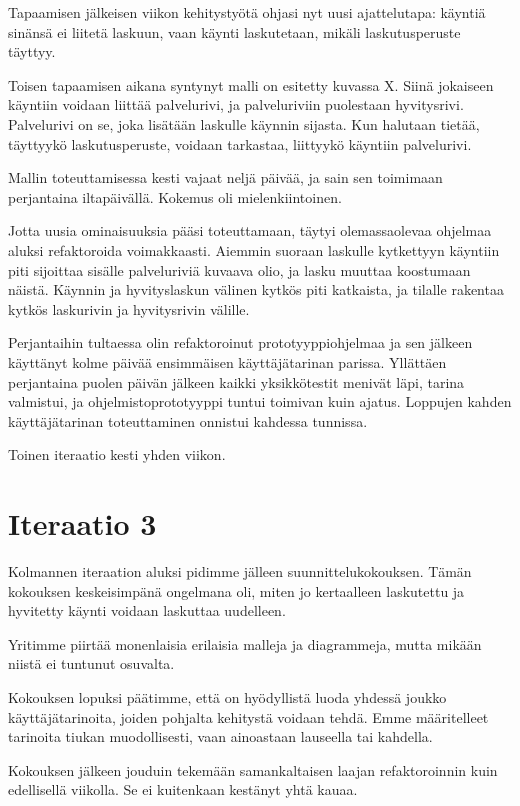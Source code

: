 Tapaamisen jälkeisen viikon kehitystyötä ohjasi nyt uusi ajattelutapa:
käyntiä sinänsä ei liitetä laskuun, vaan käynti laskutetaan, mikäli
laskutusperuste täyttyy.

Toisen tapaamisen aikana syntynyt malli on esitetty kuvassa X. Siinä
jokaiseen käyntiin voidaan liittää palvelurivi, ja palveluriviin
puolestaan hyvitysrivi. Palvelurivi on se, joka lisätään laskulle
käynnin sijasta. Kun halutaan tietää, täyttyykö laskutusperuste, voidaan
tarkastaa, liittyykö käyntiin palvelurivi.

Mallin toteuttamisessa kesti vajaat neljä päivää, ja sain sen toimimaan
perjantaina iltapäivällä. Kokemus oli mielenkiintoinen.

Jotta uusia ominaisuuksia pääsi toteuttamaan, täytyi olemassaolevaa
ohjelmaa aluksi refaktoroida voimakkaasti. Aiemmin suoraan laskulle
kytkettyyn käyntiin piti sijoittaa sisälle palveluriviä kuvaava olio, ja
lasku muuttaa koostumaan näistä. Käynnin ja hyvityslaskun välinen kytkös
piti katkaista, ja tilalle rakentaa kytkös laskurivin ja hyvitysrivin
välille.

Perjantaihin tultaessa olin refaktoroinut prototyyppiohjelmaa ja sen
jälkeen käyttänyt kolme päivää ensimmäisen käyttäjätarinan parissa.
Yllättäen perjantaina puolen päivän jälkeen kaikki yksikkötestit menivät
läpi, tarina valmistui, ja ohjelmistoprototyyppi tuntui toimivan kuin
ajatus. Loppujen kahden käyttäjätarinan toteuttaminen onnistui kahdessa
tunnissa.

Toinen iteraatio kesti yhden viikon.

\hypertarget{iteraatio-3}{%
\section{Iteraatio 3}\label{iteraatio-3}}

Kolmannen iteraation aluksi pidimme jälleen suunnittelukokouksen. Tämän
kokouksen keskeisimpänä ongelmana oli, miten jo kertaalleen laskutettu
ja hyvitetty käynti voidaan laskuttaa uudelleen.

Yritimme piirtää monenlaisia erilaisia malleja ja diagrammeja, mutta
mikään niistä ei tuntunut osuvalta.

Kokouksen lopuksi päätimme, että on hyödyllistä luoda yhdessä joukko
käyttäjätarinoita, joiden pohjalta kehitystä voidaan tehdä. Emme
määritelleet tarinoita tiukan muodollisesti, vaan ainoastaan lauseella
tai kahdella.

Kokouksen jälkeen jouduin tekemään samankaltaisen laajan refaktoroinnin
kuin edellisellä viikolla. Se ei kuitenkaan kestänyt yhtä kauaa.

